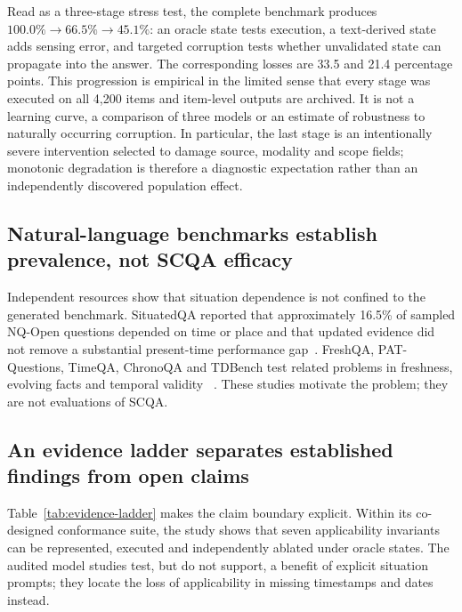 Read as a three-stage stress test, the complete benchmark produces
$100.0\%\rightarrow66.5\%\rightarrow45.1\%$: an oracle state tests execution,
a text-derived state adds sensing error, and targeted corruption tests whether
unvalidated state can propagate into the answer. The corresponding losses are
33.5 and 21.4 percentage points. This progression is empirical in the limited
sense that every stage was executed on all 4,200 items and item-level outputs
are archived. It is not a learning curve, a comparison of three models or an
estimate of robustness to naturally occurring corruption. In particular, the
last stage is an intentionally severe intervention selected to damage source,
modality and scope fields; monotonic degradation is therefore a diagnostic
expectation rather than an independently discovered population effect.

\subsection*{Natural-language benchmarks establish prevalence, not SCQA efficacy}

Independent resources show that situation dependence is not confined to the
generated benchmark. SituatedQA reported that approximately 16.5\% of sampled
NQ-Open questions depended on time or place and that updated evidence did not
remove a substantial present-time performance gap~\cite{zhang2021situatedqa}.
FreshQA, PAT-Questions, TimeQA, ChronoQA and TDBench test related problems in
freshness, evolving facts and temporal validity
~\cite{vu2023freshqa,meem2024pat,chen2021timeqa,chen2025chronoqa,kim2025tdbench}.
These studies motivate the problem; they are not evaluations of SCQA.

\subsection*{An evidence ladder separates established findings from open claims}

Table~\ref{tab:evidence-ladder} makes the claim boundary explicit. Within its
co-designed conformance suite, the study shows that seven applicability
invariants can be represented, executed and independently ablated under oracle
states. The audited model studies test, but do not support, a benefit of
explicit situation prompts; they locate the loss of applicability in missing
timestamps and dates instead.

